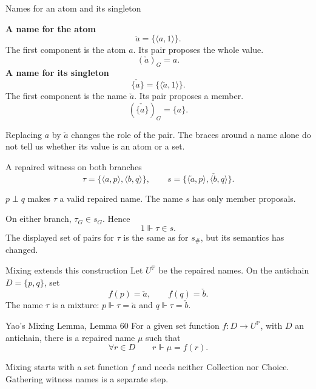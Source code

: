 \documentclass[aspectratio=169,11pt]{beamer}
\begin{document}
\begin{frame}[t]{Names for an atom and its singleton}
\begin{ACcolumns}
\ACequalcolumn
\textbf{A name for the atom}
\[
\check a=\{\langle a,1\rangle\}.
\]
The first component is the atom $a$.
Its pair proposes the whole value.
\[
(\check a)_G=a.
\]
\ACequalcolumn
\textbf{A name for its singleton}
\[
\check{\{a\}}=\{\langle\check a,1\rangle\}.
\]
The first component is the name $\check a$.
Its pair proposes a member.
\[
(\check{\{a\}})_G=\{a\}.
\]
\end{ACcolumns}
\medskip
Replacing $a$ by $\check a$ changes the role of the pair. The braces around a name alone do not tell us whether its value is an atom or a set.
\end{frame}

\begin{frame}[t]{A repaired witness on both branches}
\[
\tau=\{\langle a,p\rangle,\langle b,q\rangle\},\qquad
s=\{\langle\check a,p\rangle,\langle\check b,q\rangle\}.
\]
\begin{ACcolumns}
\ACdiagramcolumn
\centering{}
\ACtextcolumn
$p\perp q$ makes $\tau$ a valid repaired name.
The name $s$ has only member proposals.
\medskip\par
On either branch, $\tau_G\in s_G$. Hence
\[
1\Vdash\tau\in s.
\]
The displayed set of pairs for $\tau$ is the same as for $s_{\#}$, but its semantics has changed.
\end{ACcolumns}
\end{frame}

\begin{frame}[t]{Mixing extends this construction}
Let $U^{\mathbb P}$ be the repaired names. On the antichain $D=\{p,q\}$, set
\[
f(p)=\check a,\qquad f(q)=\check b.
\]
The name $\tau$ is a mixture: $p\Vdash\tau=\check a$ and $q\Vdash\tau=\check b$.
\begin{block}{Yao's Mixing Lemma, Lemma 60}
For a given set function $f:D\to U^{\mathbb P}$, with $D$ an antichain, there is a repaired name $\mu$ such that
\[
\forall r\in D\qquad r\Vdash\mu=f(r).
\]
\end{block}
Mixing starts with a set function $f$ and needs neither Collection nor Choice. Gathering witness names is a separate step.
\end{frame}
\end{document}
